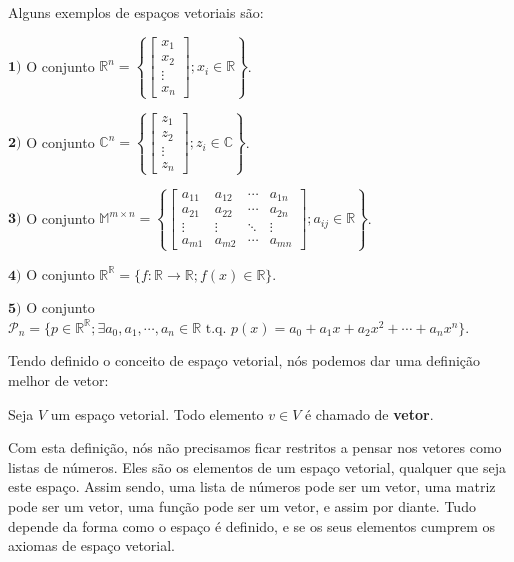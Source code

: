 \begin{Example}
	Alguns exemplos de espaços vetoriais são:
	
	$\mathbf{1)}$ O conjunto $\mathbb{R}^n = \left\{\begin{bmatrix}
		x_1 \\
		x_2 \\
		\vdots \\
		x_n
	\end{bmatrix}; x_i\in\mathbb{R}\right\}$.
	
	$\mathbf{2)}$ O conjunto $\mathbb{C}^n = \left\{\begin{bmatrix}
		z_1 \\
		z_2 \\
		\vdots \\
		z_n
	\end{bmatrix}; z_i\in\mathbb{C}\right\}$.
	
	$\mathbf{3)}$ O conjunto $\mathbb{M}^{m\times n} = \left\{\begin{bmatrix}
		a_{11} & a_{12} & \cdots & a_{1n} \\
		a_{21} & a_{22} & \cdots & a_{2n} \\
		\vdots & \vdots & \ddots & \vdots \\
		a_{m1} & a_{m2} & \cdots & a_{mn}
	\end{bmatrix}; a_{ij}\in\mathbb{R}\right\}$.
	
	$\mathbf{4)}$ O conjunto $\mathbb{R}^{\mathbb{R}} = \{f:\mathbb{R}\to\mathbb{R}; f(x)\in\mathbb{R}\}$.
	
	$\mathbf{5)}$ O conjunto $\mathcal{P}_n = \{p\in\mathbb{R}^{\mathbb{R}}; \exists a_0, a_1, \cdots, a_n\in\mathbb{R} \text{ t.q. } p(x) = a_0 + a_1x + a_2x^2 + \cdots + a_nx^n\}$.
\end{Example}

Tendo definido o conceito de espaço vetorial, nós podemos dar uma definição melhor de vetor:

\begin{Definition}
	Seja $V$ um espaço vetorial. Todo elemento $v\in V$ é chamado de \textbf{vetor}.
\end{Definition}

Com esta definição, nós não precisamos ficar restritos a pensar nos vetores como listas de números. Eles são os elementos de um espaço vetorial, qualquer que seja este espaço. Assim sendo, uma lista de números pode ser um vetor, uma matriz pode ser um vetor, uma função pode ser um vetor, e assim por diante. Tudo depende da forma como o espaço é definido, e se os seus elementos cumprem os axiomas de espaço vetorial.

